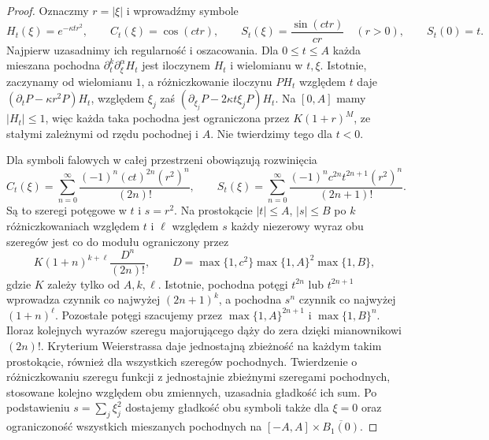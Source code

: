 \begin{proof}
Oznaczmy $r=|\xi|$ i wprowadźmy symbole
\[
 H_t(\xi)=e^{-\kappa tr^2},\qquad
 C_t(\xi)=\cos(ctr),\qquad
 S_t(\xi)=\frac{\sin(ctr)}{cr}
 \quad(r>0),\qquad S_t(0)=t.
\]
Najpierw uzasadnimy ich regularność i oszacowania.
Dla $0\le t\le A$ każda mieszana pochodna
$\partial_t^k\partial_\xi^\alpha H_t$
jest iloczynem $H_t$ i wielomianu w $t,\xi$.
Istotnie, zaczynamy od wielomianu $1$,
a różniczkowanie iloczynu $PH_t$
względem $t$ daje $(\partial_tP-\kappa r^2P)H_t$,
względem $\xi_j$ zaś
$(\partial_{\xi_j}P-2\kappa t\xi_jP)H_t$.
Na $[0,A]$ mamy $|H_t|\le1$, więc każda taka
pochodna jest ograniczona przez
$K(1+r)^M$, ze stałymi zależnymi od rzędu
pochodnej i $A$. Nie twierdzimy tego dla $t<0$.

Dla symboli falowych w całej przestrzeni
obowiązują rozwinięcia
\[
 C_t(\xi)=\sum_{n=0}^\infty
 \frac{(-1)^n(ct)^{2n}(r^2)^n}{(2n)!},
 \qquad
 S_t(\xi)=\sum_{n=0}^\infty
 \frac{(-1)^nc^{2n}t^{2n+1}(r^2)^n}{(2n+1)!}.
\]
Są to szeregi potęgowe w $t$ i $s=r^2$.
Na prostokącie $|t|\le A$, $|s|\le B$
po $k$ różniczkowaniach względem $t$
i $\ell$ względem $s$ każdy niezerowy wyraz
obu szeregów jest co do modułu ograniczony
przez
\[
 K(1+n)^{k+\ell}\frac{D^n}{(2n)!},
 \qquad
 D=\max\{1,c^2\}\max\{1,A\}^2\max\{1,B\},
\]
gdzie $K$ zależy tylko od $A,k,\ell$.
Istotnie, pochodna potęgi $t^{2n}$ lub
$t^{2n+1}$ wprowadza czynnik co najwyżej
$(2n+1)^k$, a pochodna $s^n$ czynnik
co najwyżej $(1+n)^\ell$. Pozostałe potęgi
szacujemy przez $\max\{1,A\}^{2n+1}$
i $\max\{1,B\}^n$.
Iloraz kolejnych wyrazów szeregu majorującego
dąży do zera dzięki mianownikowi $(2n)!$.
Kryterium Weierstrassa daje jednostajną zbieżność
na każdym takim prostokącie, również dla
wszystkich szeregów pochodnych.
Twierdzenie o różniczkowaniu szeregu funkcji
z jednostajnie zbieżnymi szeregami pochodnych,
stosowane kolejno względem obu zmiennych,
uzasadnia gładkość ich sum.
Po podstawieniu $s=\sum_j\xi_j^2$ dostajemy
gładkość obu symboli także dla $\xi=0$
oraz ograniczoność wszystkich mieszanych
pochodnych na $[-A,A]\times\overline{B_1(0)}$.


\end{proof}
